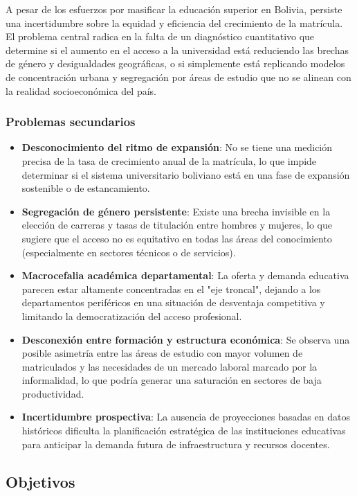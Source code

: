 \documentclass[10pt, twocolumn]{article}
\begin{document}
A pesar de los esfuerzos por masificar la educación superior en Bolivia, persiste una incertidumbre sobre la equidad y eficiencia del crecimiento de la matrícula. El problema central radica en la falta de un diagnóstico cuantitativo que determine si el aumento en el acceso a la universidad está reduciendo las brechas de género y desigualdades geográficas, o si simplemente está replicando modelos de concentración urbana y segregación por áreas de estudio que no se alinean con la realidad socioeconómica del país.

\subsubsection{Problemas secundarios}

\begin{itemize}
  \item \textbf{Desconocimiento del ritmo de expansión}: No se tiene una medición precisa de la tasa de crecimiento anual de la matrícula, lo que impide determinar si el sistema universitario boliviano está en una fase de expansión sostenible o de estancamiento.
  \item \textbf{Segregación de género persistente}: Existe una brecha invisible en la elección de carreras y tasas de titulación entre hombres y mujeres, lo que sugiere que el acceso no es equitativo en todas las áreas del conocimiento (especialmente en sectores técnicos o de servicios).
  \item \textbf{Macrocefalia académica departamental}: La oferta y demanda educativa parecen estar altamente concentradas en el "eje troncal", dejando a los departamentos periféricos en una situación de desventaja competitiva y limitando la democratización del acceso profesional.
  \item \textbf{Desconexión entre formación y estructura económica}: Se observa una posible asimetría entre las áreas de estudio con mayor volumen de matriculados y las necesidades de un mercado laboral marcado por la informalidad, lo que podría generar una saturación en sectores de baja productividad.
  \item \textbf{Incertidumbre prospectiva}: La ausencia de proyecciones basadas en datos históricos dificulta la planificación estratégica de las instituciones educativas para anticipar la demanda futura de infraestructura y recursos docentes.
\end{itemize}

\subsection{Objetivos}
\end{document}
